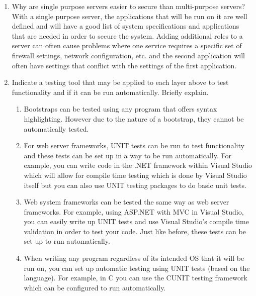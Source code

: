 \documentclass[12pt]{article}
\theoremstyle{plain}
\theoremstyle{definition}
\theoremstyle{plain}
\begin{document}
\begin{enumerate}
\item Why are single purpose servers easier to secure than multi-purpose servers?\\
With a single purpose server, the applications that will be run on it are well defined and will have a good list of system specifications and applications that are needed in order to secure the system. Adding additional roles to a server can often cause problems where one service requires a specific set of firewall settings, network configuration, etc. and the second application will often have settings that conflict with the settings of the first application.

\item Indicate a testing tool that may be applied to each layer above to test functionality and if it can be run automatically. Briefly explain.
\begin{enumerate}
	\item Bootstraps can be tested using any program that offers syntax highlighting. However due to the nature of a bootstrap, they cannot be automatically tested.
	\item For web server frameworks, UNIT tests can be run to test functionality and these tests can be set up in a way to be run automatically. For example, you can write code in the .NET framework within Visual Studio which will allow for compile time testing which is done by Visual Studio itself but you can also use UNIT testing packages to do basic unit tests.
	\item Web system frameworks can be tested the same way as web server frameworks. For example, using ASP.NET with MVC in Visual Studio, you can easily write up UNIT tests and use Visual Studio's compile time validation in order to test your code. Just like before, these tests can be set up to run automatically.
	\item When writing any program regardless of its intended OS that it will be run on, you can set up automatic testing using UNIT tests (based on the language). For example, in C you can use the CUNIT testing framework which can be configured to run automatically.
\end{enumerate}


\end{enumerate}
\end{document}
